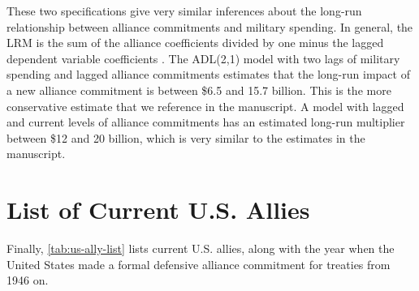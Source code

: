 \documentclass[12pt]{article}
\begin{document}
These two specifications give very similar inferences about the long-run relationship between alliance commitments and military spending. 
In general, the LRM is the sum of the alliance coefficients divided by one minus the lagged dependent variable coefficients \citep{CookWebb2021}.
The ADL(2,1) model with two lags of military spending and lagged alliance commitments estimates that the long-run impact of a new alliance commitment is between \$6.5 and 15.7 billion. 
This is the more conservative estimate that we reference in the manuscript. 
A model with lagged and current levels of alliance commitments has an estimated long-run multiplier between \$12 and 20 billion, which is very similar to the estimates in the manuscript. 


\section{List of Current U.S. Allies}

Finally, \autoref{tab:us-ally-list} lists current U.S. allies, along with the year when the United States made a formal defensive alliance commitment for treaties from 1946 on.
\end{document}
